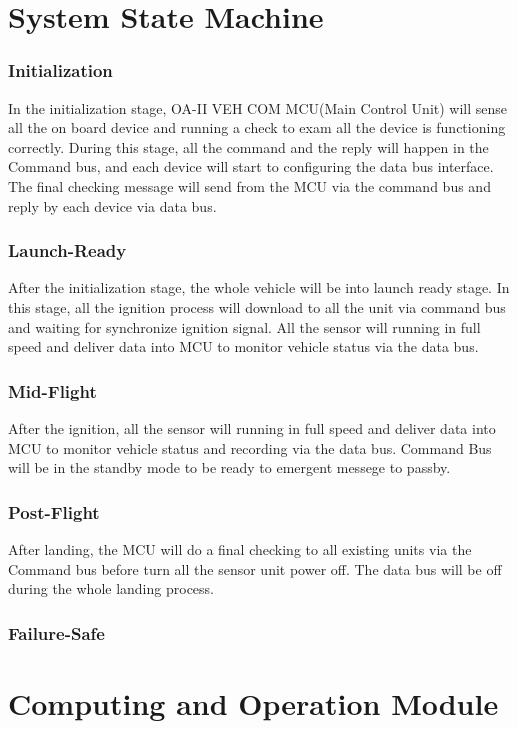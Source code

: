 \documentclass[12pt,article]{memoir}
\begin{document}
\chapter{System State Machine}
\subsection{Initialization}
In the initialization stage, OA-II VEH COM MCU(Main Control Unit) will sense all the on board device and running a check to exam all the device is functioning correctly. During this stage, all the command and the reply will happen in the Command bus, and each device will start to configuring the data bus interface. The final checking message will send from the MCU via the command bus and reply by each device via data bus.
\subsection{Launch-Ready}
After the initialization stage, the whole vehicle will be into launch ready stage. In this stage, all the ignition process will download to all the unit via command bus and waiting for synchronize ignition signal. All the sensor will running in full speed and deliver data into MCU to monitor vehicle status via the data bus.
\subsection{Mid-Flight}
After the ignition, all the sensor will running in full speed and deliver data into MCU to monitor vehicle status and recording via the data bus. Command Bus will be in the standby mode to be ready to emergent messege to passby.
\subsection{Post-Flight}
After landing, the MCU will do a final checking to all existing units via the Command bus before turn all the sensor unit power off. The data bus will be off during the whole landing process.
\subsection{Failure-Safe}
\newpage
\chapter{Computing and Operation Module}
\end{document}
